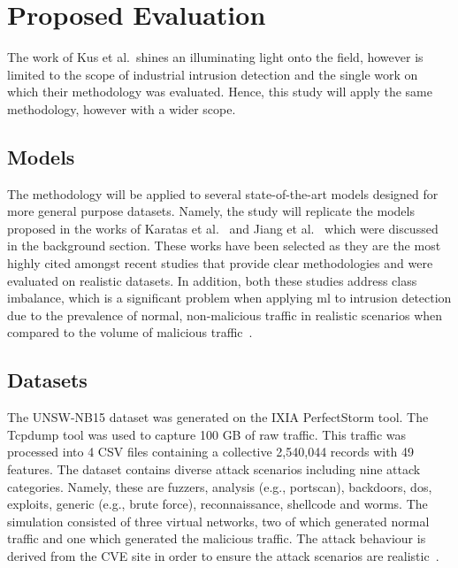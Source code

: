 \chapter{Proposed Evaluation}%
\label{chp:evaluation}

The work of Kus et al.\ shines an illuminating light onto the field, however is
limited to the scope of industrial intrusion detection and the single work on
which their methodology was evaluated. Hence, this study will apply the same
methodology, however with a wider scope.

\section{Models}%
\label{sec:models}

The methodology will be applied to several state-of-the-art models designed for
more general purpose datasets. Namely, the study will replicate the models
proposed in the works of Karatas et al.~\cite{Karatas} and Jiang et
al.~\cite{Jiang} which were discussed in the background section. These works
have been selected as they are the most highly cited amongst recent studies
that provide clear methodologies and were evaluated on realistic datasets. In
addition, both these studies address class imbalance, which is a significant
problem when applying \gls{ml} to intrusion detection due to the prevalence of
normal, non-malicious traffic in realistic scenarios when compared to the
volume of malicious traffic~\cite{imbalance}.

\section{Datasets}%
\label{sec:datasets}

The UNSW-NB15 dataset was generated on the IXIA PerfectStorm tool. The Tcpdump
tool was used to capture 100 GB of raw traffic. This traffic was processed into
4 CSV files containing a collective 2,540,044 records with 49 features. The
dataset contains diverse attack scenarios including nine attack categories.
Namely, these are fuzzers, analysis (e.g., portscan), backdoors, \gls{dos},
exploits, generic (e.g., brute force), reconnaissance, shellcode and worms. The
simulation consisted of three virtual networks, two of which generated normal
traffic and one which generated the malicious traffic. The attack behaviour is
derived from the CVE site in order to ensure the attack scenarios are
realistic~\cite{unsw15}.


